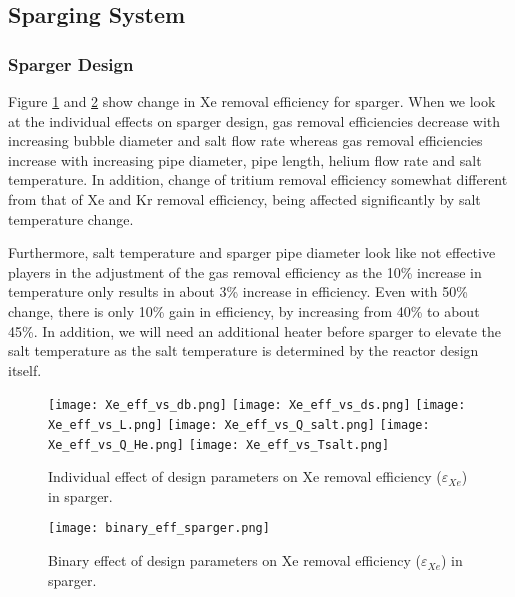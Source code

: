 \subsection{Sparging System}

\subsubsection{Sparger Design}

    Figure \ref{fig:individual_eff_sparger} and \ref{fig:binary_eff_sparger}
    show change in Xe removal efficiency for sparger. When we look at the individual effects on sparger design, gas removal efficiencies decrease with increasing bubble diameter and salt flow rate whereas gas removal efficiencies increase with increasing pipe diameter, pipe length, helium flow rate and salt temperature. In addition, change of tritium removal efficiency somewhat different from that of Xe and Kr removal efficiency, being affected significantly by salt temperature change.

    Furthermore, salt temperature and sparger pipe diameter look like not
    effective players in the adjustment of the gas removal efficiency as the
    10\% increase in temperature only results in about 3\% increase in
    efficiency. Even with 50\% change, there is only 10\% gain in efficiency, by
    increasing from 40\% to about 45\%. In addition, we will need an additional
    heater before sparger to elevate the salt temperature as the salt
    temperature is determined by the reactor design itself.

    \begin{figure}[htbp!]
        \begin{center}
            \texttt{[image: Xe\_eff\_vs\_db.png]}
            \texttt{[image: Xe\_eff\_vs\_ds.png]}
            \texttt{[image: Xe\_eff\_vs\_L.png]}
            \texttt{[image: Xe\_eff\_vs\_Q\_salt.png]}
            \texttt{[image: Xe\_eff\_vs\_Q\_He.png]}
            \texttt{[image: Xe\_eff\_vs\_Tsalt.png]}
        \end{center}
        \caption{Individual effect of design parameters on Xe removal
            efficiency
            ($\varepsilon$$_{Xe}$) in sparger.}
        \label{fig:individual_eff_sparger}
    \end{figure}

    \begin{figure}[htbp!]
        \begin{center}
            \texttt{[image: binary\_eff\_sparger.png]}
        \end{center}
        \caption{Binary effect of design parameters on Xe removal
            efficiency
            ($\varepsilon$$_{Xe}$) in sparger.}
        \label{fig:binary_eff_sparger}
    \end{figure}


